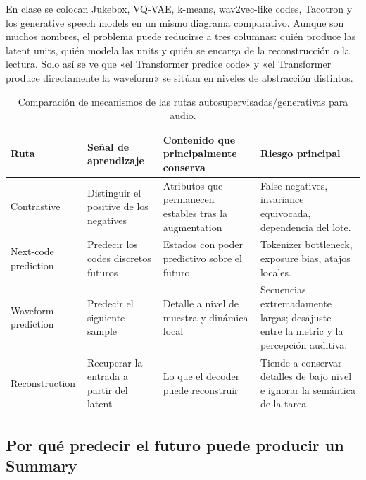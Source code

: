 En clase se colocan Jukebox, VQ-VAE, k-means, wav2vec-like codes, Tacotron y los generative speech models en un mismo diagrama comparativo. Aunque son muchos nombres, el problema puede reducirse a tres columnas: quién produce las latent units, quién modela las units y quién se encarga de la reconstrucción o la lectura. Solo así se ve que «el Transformer predice code» y «el Transformer produce directamente la waveform» se sitúan en niveles de abstracción distintos.


\begin{table}[H]
\centering
\small
\caption{Comparación de mecanismos de las rutas autosupervisadas/generativas para audio.}
\begin{tabularx}{\textwidth}{L{0.20\textwidth}L{0.22\textwidth}L{0.24\textwidth}X}
\toprule
Ruta & Señal de aprendizaje & Contenido que principalmente conserva & Riesgo principal \\
\midrule
Contrastive & Distinguir el positive de los negatives & Atributos que permanecen estables tras la augmentation & False negatives, invariance equivocada, dependencia del lote. \\
Next-code prediction & Predecir los codes discretos futuros & Estados con poder predictivo sobre el futuro & Tokenizer bottleneck, exposure bias, atajos locales. \\
Waveform prediction & Predecir el siguiente sample & Detalle a nivel de muestra y dinámica local & Secuencias extremadamente largas; desajuste entre la metric y la percepción auditiva. \\
Reconstruction & Recuperar la entrada a partir del latent & Lo que el decoder puede reconstruir & Tiende a conservar detalles de bajo nivel e ignorar la semántica de la tarea. \\
\bottomrule
\end{tabularx}
\end{table}


\subsection{Por qué predecir el futuro puede producir un Summary}

